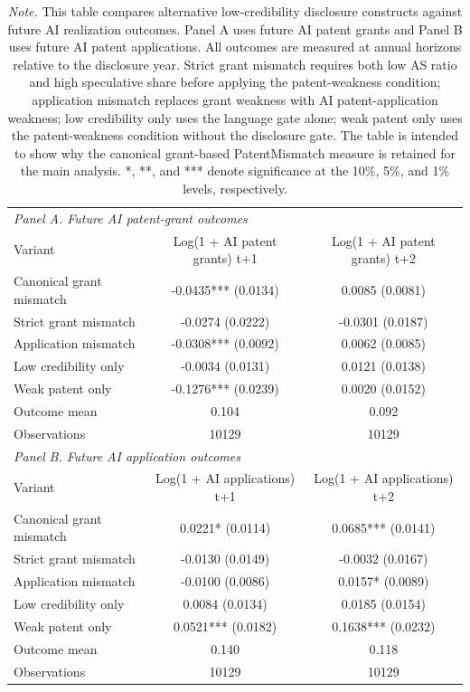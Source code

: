 \begin{table}[!htbp]
\centering
\caption{Construct-variant screen for future AI realization}
\label{tab:construct_variant_screen}
\caption*{\footnotesize \textit{Note.} This table compares alternative low-credibility disclosure constructs against future AI realization outcomes. Panel A uses future AI patent grants and Panel B uses future AI patent applications. All outcomes are measured at annual horizons relative to the disclosure year. Strict grant mismatch requires both low AS ratio and high speculative share before applying the patent-weakness condition; application mismatch replaces grant weakness with AI patent-application weakness; low credibility only uses the language gate alone; weak patent only uses the patent-weakness condition without the disclosure gate. The table is intended to show why the canonical grant-based PatentMismatch measure is retained for the main analysis. *, **, and *** denote significance at the 10\%, 5\%, and 1\% levels, respectively.}
\begin{tabular}{lcc}
\hline
\multicolumn{3}{l}{\textit{Panel A. Future AI patent-grant outcomes}} \\
Variant & Log(1 + AI patent grants) t+1 & Log(1 + AI patent grants) t+2 \\
\hline
Canonical grant mismatch & -0.0435*** (0.0134) & 0.0085 (0.0081) \\
Strict grant mismatch & -0.0274 (0.0222) & -0.0301 (0.0187) \\
Application mismatch & -0.0308*** (0.0092) & 0.0062 (0.0085) \\
Low credibility only & -0.0034 (0.0131) & 0.0121 (0.0138) \\
Weak patent only & -0.1276*** (0.0239) & 0.0020 (0.0152) \\
Outcome mean & 0.104 & 0.092 \\
Observations & 10129 & 10129 \\
\hline
\multicolumn{3}{l}{\textit{Panel B. Future AI application outcomes}} \\
Variant & Log(1 + AI applications) t+1 & Log(1 + AI applications) t+2 \\
\hline
Canonical grant mismatch & 0.0221* (0.0114) & 0.0685*** (0.0141) \\
Strict grant mismatch & -0.0130 (0.0149) & -0.0032 (0.0167) \\
Application mismatch & -0.0100 (0.0086) & 0.0157* (0.0089) \\
Low credibility only & 0.0084 (0.0134) & 0.0185 (0.0154) \\
Weak patent only & 0.0521*** (0.0182) & 0.1638*** (0.0232) \\
Outcome mean & 0.140 & 0.118 \\
Observations & 10129 & 10129 \\
\hline
\end{tabular}
\end{table}
